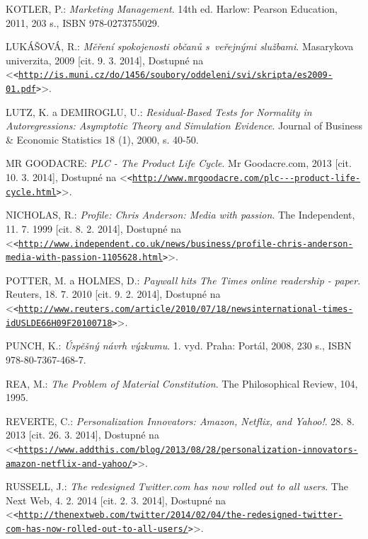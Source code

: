 \documentclass[12pt,twoside,openany]{fithesis}
\let\origurl\url
\def\url#1{\texttt{<\origurl{#1}>}}
\begin{document}
\begin{thebibliography}{99}
KOTLER, P.: \emph{Marketing Management}. 14th ed. Harlow: Pearson Education, 2011, 203 s., ISBN 978-0273755029.

LUKÁŠOVÁ, R.: \emph{Měření spokojenosti občanů s~veřejnými službami}. Masarykova univerzita, 2009 [cit. 9. 3. 2014], Dostupné na {\textless}\url{http://is.muni.cz/do/1456/soubory/oddeleni/svi/skripta/es2009-01.pdf}{\textgreater}.

LUTZ, K. a DEMIROGLU, U.: \emph{Residual-Based Tests for Normality in Autoregressions: Asymptotic
      Theory and Simulation Evidence}. Journal of Business \& Economic Statistics 18
        (1), 2000, s. 40-50.

MR GOODACRE: \emph{PLC - The Product Life Cycle}. Mr Goodacre.com, 2013 [cit. 10. 3. 2014], Dostupné na {\textless}\url{http://www.mrgoodacre.com/plc---product-life-cycle.html}{\textgreater}.

NICHOLAS, R.: \emph{Profile: Chris Anderson: Media with passion}. The Independent, 11. 7. 1999 [cit. 8. 2. 2014], Dostupné na {\textless}\url{http://www.independent.co.uk/news/business/profile-chris-anderson-media-with-passion-1105628.html}{\textgreater}.

POTTER, M. a HOLMES, D.: \emph{Paywall hits The Times online readership - paper}. Reuters, 18. 7. 2010 [cit. 9. 2. 2014], Dostupné na {\textless}\url{http://www.reuters.com/article/2010/07/18/newsinternational-times-idUSLDE66H09F20100718}{\textgreater}.

PUNCH, K.: \emph{Úspěšný návrh výzkumu}. 1. vyd. Praha: Portál, 2008, 230 s., ISBN 978-80-7367-468-7.

REA, M.: \emph{The Problem of Material Constitution}. The Philosophical Review, 104, 1995.

REVERTE, C.: \emph{Personalization Innovators: Amazon, Netflix, and Yahoo!}. 28. 8. 2013 [cit. 26. 3. 2014], Dostupné na {\textless}\url{https://www.addthis.com/blog/2013/08/28/personalization-innovators-amazon-netflix-and-yahoo/}{\textgreater}.

RUSSELL, J.: \emph{The redesigned Twitter.com has now rolled out to all users}.
The Next Web, 4. 2. 2014 [cit. 2. 3. 2014], Dostupné na {\textless}\url{http://thenextweb.com/twitter/2014/02/04/the-redesigned-twitter-com-has-now-rolled-out-to-all-users/}{\textgreater}.


\end{thebibliography}
\end{document}
